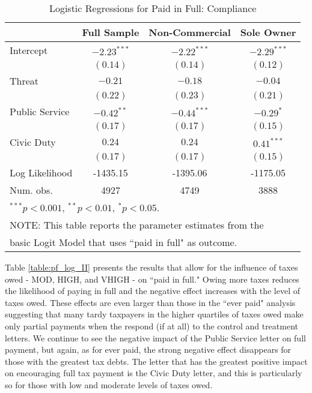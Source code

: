 \documentclass[12pt,titlepage]{article}
\begin{document}
\begin{table}[htbp]
\caption{Logistic Regressions for Paid in Full: Compliance}
\begin{center}
\begin{tabular}{l c c c }
\hline
               & Full Sample & Non-Commercial & Sole Owner \\
\hline
Intercept      & $-2.23^{***}$ & $-2.22^{***}$ & $-2.29^{***}$ \\
               & $(0.14)$      & $(0.14)$      & $(0.12)$      \\
Threat         & $-0.21$       & $-0.18$       & $-0.04$       \\
               & $(0.22)$      & $(0.23)$      & $(0.21)$      \\
Public Service & $-0.42^{**}$  & $-0.44^{***}$ & $-0.29^{*}$   \\
               & $(0.17)$      & $(0.17)$      & $(0.15)$      \\
Civic Duty     & $0.24$        & $0.24$        & $0.41^{***}$  \\
               & $(0.17)$      & $(0.17)$      & $(0.15)$      \\
\hline
Log Likelihood & -1435.15      & -1395.06      & -1175.05      \\
Num. obs.      & 4927          & 4749          & 3888          \\
\hline
\multicolumn{4}{l}{$^{***}p<0.001$, $^{**}p<0.01$, $^*p<0.05$.} \\
\multicolumn{4}{l}{NOTE: This table reports the parameter estimates from the} \\
\multicolumn{4}{l}{basic Logit Model that uses ``paid in full" as outcome.} \\
\end{tabular}
\label{table:pf_log_I}
\end{center}
\end{table}


Table \ref{table:pf_log_II} presents the results that allow for the influence of
taxes owed - MOD, HIGH, and VHIGH - on ``paid in full."  Owing more
taxes reduces the likelihood of paying in full and the negative effect
increases with the level of taxes owed.  These effects are even larger
than those in the ``ever paid" analysis suggesting that many tardy
taxpayers in the higher quartiles of taxes owed make only partial
payments when the respond (if at all) to the control and treatment
letters.  We continue to see the negative impact of the Public Service
letter on full payment, but again, as for ever paid, the strong
negative effect disappears for those with the greatest tax debts.  The
letter that has the greatest positive impact on encouraging full tax
payment is the Civic Duty letter, and this is particularly so for
those with low and moderate levels of taxes owed.
\end{document}

